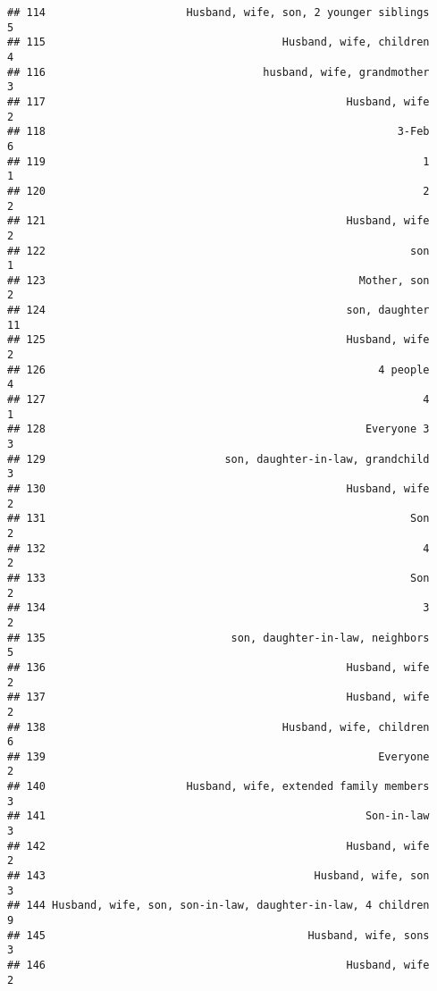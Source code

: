 \documentclass[
]{article}
\begin{document}
\begin{verbatim}
## 114                      Husband, wife, son, 2 younger siblings             5
## 115                                     Husband, wife, children             4
## 116                                  husband, wife, grandmother             3
## 117                                               Husband, wife             2
## 118                                                       3-Feb             6
## 119                                                           1             1
## 120                                                           2             2
## 121                                               Husband, wife             2
## 122                                                         son             1
## 123                                                 Mother, son             2
## 124                                               son, daughter            11
## 125                                               Husband, wife             2
## 126                                                    4 people             4
## 127                                                           4             1
## 128                                                  Everyone 3             3
## 129                            son, daughter-in-law, grandchild             3
## 130                                               Husband, wife             2
## 131                                                         Son             2
## 132                                                           4             2
## 133                                                         Son             2
## 134                                                           3             2
## 135                             son, daughter-in-law, neighbors             5
## 136                                               Husband, wife             2
## 137                                               Husband, wife             2
## 138                                     Husband, wife, children             6
## 139                                                    Everyone             2
## 140                      Husband, wife, extended family members             3
## 141                                                  Son-in-law             3
## 142                                               Husband, wife             2
## 143                                          Husband, wife, son             3
## 144 Husband, wife, son, son-in-law, daughter-in-law, 4 children             9
## 145                                         Husband, wife, sons             3
## 146                                               Husband, wife             2

\end{verbatim}
\end{document}
